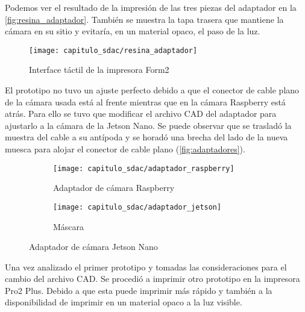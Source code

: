 Podemos ver el resultado de la impresión de las tres piezas del adaptador en la
\autoref{fig:resina_adaptador}. También se muestra la tapa trasera que mantiene
la cámara en su sitio y evitaría, en un material opaco, el paso de la luz.

\begin{figure}[H]
    \centering
    \texttt{[image: capitulo\_sdac/resina\_adaptador]}
    \caption{Interface táctil de la impresora Form2}\label{fig:resina_adaptador}
\end{figure}

El prototipo no tuvo un ajuste perfecto debido a que el conector de cable plano
de la cámara usada está al frente mientras que en la cámara Raspberry está
atrás. Para ello se tuvo que modificar el archivo CAD del adaptador para
ajustarlo a la cámara de la Jetson Nano. Se puede observar que se trasladó la
muestra del cable a su antípoda y se horadó una brecha del lado de la nueva
muesca para alojar el conector de cable plano (\autoref{fig:adaptadores}).

\begin{figure}[H]
    \centering
    \begin{subfigure}{.5\textwidth}
        \centering
        \texttt{[image: capitulo\_sdac/adaptador\_raspberry]}
        \caption{Adaptador de cámara Raspberry}
    \end{subfigure}%
    \begin{subfigure}{.5\textwidth}
        \centering
        \texttt{[image: capitulo\_sdac/adaptador\_jetson]}
        \caption{Máscara}
    \end{subfigure}
    \caption{Adaptador de cámara Jetson Nano}
    \label{fig:adaptadores}
    \end{figure}

Una vez analizado el primer prototipo y tomadas las consideraciones para el
cambio del archivo CAD. Se procedió a imprimir otro prototipo en la impresora
Pro2 Plus. Debido a que esta puede imprimir más rápido y también a la
disponibilidad de imprimir en un material opaco a la luz visible.



